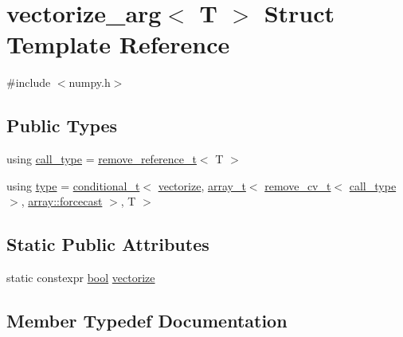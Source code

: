 \hypertarget{structvectorize__arg}{}\section{vectorize\+\_\+arg$<$ T $>$ Struct Template Reference}
\label{structvectorize__arg}


{\ttfamily \#include $<$numpy.\+h$>$}

\subsection*{Public Types}
\begin{DoxyCompactItemize}
\item 
using \mbox{\hyperlink{structvectorize__arg_a465d48643eac1a5fb514819ceaf8eb1c}{call\+\_\+type}} = \mbox{\hyperlink{detail_2common_8h_a3a08cea569e6926ac8d7d74dd7178b5f}{remove\+\_\+reference\+\_\+t}}$<$ T $>$
\item 
using \mbox{\hyperlink{structvectorize__arg_a1eac44d967c2119c39a13843b8546c9d}{type}} = \mbox{\hyperlink{detail_2common_8h_acdb0eff728aec08ed6fff07d2885ea9d}{conditional\+\_\+t}}$<$ \mbox{\hyperlink{structvectorize__arg_a2713dcb369c1ff6d3ec66f9b91419735}{vectorize}}, \mbox{\hyperlink{classarray__t}{array\+\_\+t}}$<$ \mbox{\hyperlink{detail_2common_8h_a92dc8767e0b0b9b6022f61cb5b52278f}{remove\+\_\+cv\+\_\+t}}$<$ \mbox{\hyperlink{structvectorize__arg_a465d48643eac1a5fb514819ceaf8eb1c}{call\+\_\+type}} $>$, \mbox{\hyperlink{classarray_af40deff69606a75cf645863432967ba7a2886e477a3f6090266168e82d389adc1}{array\+::forcecast}} $>$, T $>$
\end{DoxyCompactItemize}
\subsection*{Static Public Attributes}
\begin{DoxyCompactItemize}
\item 
static constexpr \mbox{\hyperlink{asdl_8h_af6a258d8f3ee5206d682d799316314b1}{bool}} \mbox{\hyperlink{structvectorize__arg_a2713dcb369c1ff6d3ec66f9b91419735}{vectorize}}
\end{DoxyCompactItemize}


\subsection{Member Typedef Documentation}
\mbox{\label{structvectorize__arg_a465d48643eac1a5fb514819ceaf8eb1c}} 
